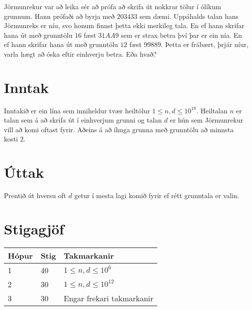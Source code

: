 
Jörmunrekur var að leika sér að prófa að skrifa út nokkrar tölur í ólíkum grunnum. Hann prófaði að byrja með $203433$ sem dæmi. Uppáhalds
talan hans Jörmunreks er níu, svo honum finnst þetta ekki merkileg tala. En ef hann skrifar hana út með grunntölu $16$ fæst $31AA9$ sem
er strax betra því þar er ein nía. En ef hann skrifar hana út með grunntölu $12$ fæst $99889$. Þetta er frábært, þrjár níur, varla hægt
að óska eftir einhverju betra. Eða hvað?

\section*{Inntak}


Inntakið er ein lína sem inniheldur tvær heiltölur $1 \leq n, d \leq 10^{18}$. Heiltalan $n$ er talan sem á að skrifa út í einhverjum grunni og
talan $d$ er hún sem Jörmunrekur vill að komi oftast fyrir. Aðeins á að íhuga grunna með grunntölu að minnsta kosti $2$.

\section*{Úttak}

Prentið út hversu oft $d$ getur í mesta lagi komið fyrir ef rétt grunntala er valin.

\section*{Stigagjöf}
\begin{tabular}{|l|l|l|}
    \hline
    Hópur & Stig & Takmarkanir                                 \\ \hline
    1     &  40  & $1 \leq n, d \leq 10^6$ \\ \hline
    2     &  30  & $1 \leq n, d \leq 10^{12}$ \\ \hline
    3     &  30  & Engar frekari takmarkanir \\ \hline
\end{tabular}
